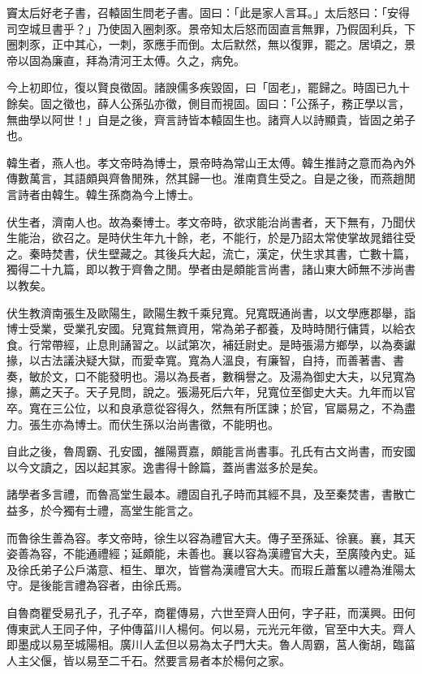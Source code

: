 \begin{pinyinscope}
竇太后好老子書，召轅固生問老子書。固曰：「此是家人言耳。」太后怒曰：「安得司空城旦書乎？」乃使固入圈刺豕。景帝知太后怒而固直言無罪，乃假固利兵，下圈刺豕，正中其心，一刺，豕應手而倒。太后默然，無以復罪，罷之。居頃之，景帝以固為廉直，拜為清河王太傅。久之，病免。

今上初即位，復以賢良徵固。諸諛儒多疾毀固，曰「固老」，罷歸之。時固已九十餘矣。固之徵也，薛人公孫弘亦徵，側目而視固。固曰：「公孫子，務正學以言，無曲學以阿世！」自是之後，齊言詩皆本轅固生也。諸齊人以詩顯貴，皆固之弟子也。

韓生者，燕人也。孝文帝時為博士，景帝時為常山王太傅。韓生推詩之意而為內外傳數萬言，其語頗與齊魯閒殊，然其歸一也。淮南賁生受之。自是之後，而燕趙閒言詩者由韓生。韓生孫商為今上博士。

伏生者，濟南人也。故為秦博士。孝文帝時，欲求能治尚書者，天下無有，乃聞伏生能治，欲召之。是時伏生年九十餘，老，不能行，於是乃詔太常使掌故晁錯往受之。秦時焚書，伏生壁藏之。其後兵大起，流亡，漢定，伏生求其書，亡數十篇，獨得二十九篇，即以教于齊魯之閒。學者由是頗能言尚書，諸山東大師無不涉尚書以教矣。

伏生教濟南張生及歐陽生，歐陽生教千乘兒寬。兒寬既通尚書，以文學應郡舉，詣博士受業，受業孔安國。兒寬貧無資用，常為弟子都養，及時時閒行傭賃，以給衣食。行常帶經，止息則誦習之。以試第次，補廷尉史。是時張湯方鄉學，以為奏讞掾，以古法議決疑大獄，而愛幸寬。寬為人溫良，有廉智，自持，而善著書、書奏，敏於文，口不能發明也。湯以為長者，數稱譽之。及湯為御史大夫，以兒寬為掾，薦之天子。天子見問，說之。張湯死后六年，兒寬位至御史大夫。九年而以官卒。寬在三公位，以和良承意從容得久，然無有所匡諫；於官，官屬易之，不為盡力。張生亦為博士。而伏生孫以治尚書徵，不能明也。

自此之後，魯周霸、孔安國，雒陽賈嘉，頗能言尚書事。孔氏有古文尚書，而安國以今文讀之，因以起其家。逸書得十餘篇，蓋尚書滋多於是矣。

諸學者多言禮，而魯高堂生最本。禮固自孔子時而其經不具，及至秦焚書，書散亡益多，於今獨有士禮，高堂生能言之。

而魯徐生善為容。孝文帝時，徐生以容為禮官大夫。傳子至孫延、徐襄。襄，其天姿善為容，不能通禮經；延頗能，未善也。襄以容為漢禮官大夫，至廣陵內史。延及徐氏弟子公戶滿意、桓生、單次，皆嘗為漢禮官大夫。而瑕丘蕭奮以禮為淮陽太守。是後能言禮為容者，由徐氏焉。

自魯商瞿受易孔子，孔子卒，商瞿傳易，六世至齊人田何，字子莊，而漢興。田何傳東武人王同子仲，子仲傳菑川人楊何。何以易，元光元年徵，官至中大夫。齊人即墨成以易至城陽相。廣川人孟但以易為太子門大夫。魯人周霸，莒人衡胡，臨菑人主父偃，皆以易至二千石。然要言易者本於楊何之家。


\end{pinyinscope}
